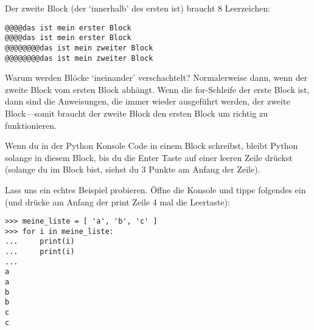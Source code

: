 Der zweite Block (der `innerhalb' des ersten ist) braucht 8 Leerzeichen:

\begin{Verbatim}[frame=single]
@@@@das ist mein erster Block
@@@@das ist mein erster Block
@@@@@@@@das ist mein zweiter Block
@@@@@@@@das ist mein zweiter Block
\end{Verbatim}

Warum werden Blöcke `ineinander' verschachtelt? Normalerweise dann, wenn der zweite Block vom ersten Block abhängt. Wenn die for-Schleife der erste Block ist, dann sind die Anweisungen, die immer wieder ausgeführt werden, der zweite Block---somit braucht der zweite Block den ersten Block um richtig zu funktionieren.

Wenn du in der Python Konsole Code in einem Block schreibst, bleibt Python solange in diesem Block, bis du die Enter Taste auf einer leeren Zeile drückst (solange du im Block bist, siehst du 3 Punkte am Anfang der Zeile).

Lass uns ein echtes Beispiel probieren. Öffne die Konsole und tippe folgendes ein (und drücke am Anfang der print Zeile 4 mal die Leertaste):

\begin{Verbatim}[frame=single]
>>> meine_liste = [ 'a', 'b', 'c' ]
>>> for i in meine_liste:
...     print(i)
...     print(i)
...
a
a
b
b
c
c
\end{Verbatim}

